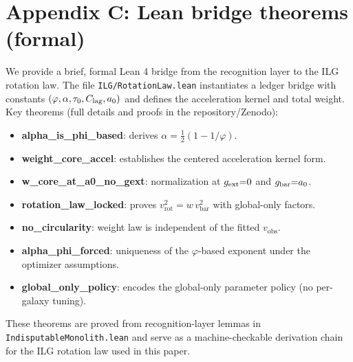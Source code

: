 \documentclass[fleqn,usenatbib]{mnras}
\begin{document}
\section*{Appendix C: Lean bridge theorems (formal)}
\noindent We provide a brief, formal Lean 4 bridge from the recognition layer to the ILG rotation law. The file \texttt{ILG/RotationLaw.lean} instantiates a ledger bridge with constants $(\varphi,\alpha,\tau_0,C_{\rm lag},a_0)$ and defines the acceleration kernel and total weight. Key theorems (full details and proofs in the repository/Zenodo):
\begin{itemize}
  \item \textbf{alpha\_is\_phi\_based}: derives $\alpha=\tfrac12(1-1/\varphi)$.
  \item \textbf{weight\_core\_accel}: establishes the centered acceleration kernel form.
  \item \textbf{w\_core\_at\_a0\_no\_gext}: normalization at $g_{\rm ext}{=}0$ and $g_{\rm bar}{=}a_0$.
  \item \textbf{rotation\_law\_locked}: proves $v_\mathrm{rot}^2=w\,v_\mathrm{bar}^2$ with global-only factors.
  \item \textbf{no\_circularity}: weight law is independent of the fitted $v_\mathrm{obs}$.
  \item \textbf{alpha\_phi\_forced}: uniqueness of the $\varphi$-based exponent under the optimizer assumptions.
  \item \textbf{global\_only\_policy}: encodes the global-only parameter policy (no per-galaxy tuning).
\end{itemize}
These theorems are proved from recognition-layer lemmas in \texttt{IndisputableMonolith.lean} and serve as a machine-checkable derivation chain for the ILG rotation law used in this paper.
\end{document}

